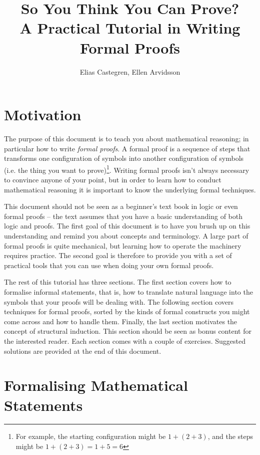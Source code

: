 \documentclass{tufte-handout}
\title[So You Think You Can Prove?]{So You Think You Can Prove?\\
{\large A Practical Tutorial in Writing Formal Proofs}}
\author{Elias Castegren, Ellen Arvidsson}
\newcounter{example}
\begin{document}
\maketitle


\section{Motivation}

The purpose of this document is to teach you about mathematical
reasoning; in particular how to write \emph{formal proofs}. A
formal proof is a sequence of steps that transforms one
configuration of symbols into another configuration of symbols
(i.e. the thing you want to prove)\footnote{For example, the
  starting configuration might be $1 + (2 + 3)$, and the steps
  might be $1 + (2 + 3) = 1 + 5 = 6$}. Writing formal proofs isn't
always necessary to convince anyone of your point, but in order to
learn how to conduct mathematical reasoning it is important to
know the underlying formal techniques.

This document should not be seen as a beginner's text book in
logic or even formal proofs -- the text assumes that you have a
basic understanding of both logic and proofs. The first goal of
this document is to have you brush up on this understanding and
remind you about concepts and terminology. A large part of formal
proofs is quite mechanical, but learning how to operate the
machinery requires practice. The second goal is therefore to
provide you with a set of practical tools that you can use when
doing your own formal proofs.

The rest of this tutorial has three sections.
%
The first section covers how to formalise informal statements,
that is, how to translate natural language into the symbols that
your proofs will be dealing with.
%
The following section covers techniques for formal proofs, sorted
by the kinds of formal constructs you might come across and how to
handle them.
%
Finally, the last section motivates the concept of structural
induction. This section should be seen as bonus content for the
interested reader.
%
Each section comes with a couple of exercises. Suggested solutions
are provided at the end of this document.

\section{Formalising Mathematical Statements}
\end{document}
